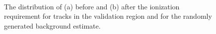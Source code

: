 \begin{figure}[h]
\centering
{}
\\
\caption{The distribution of \mdedx (a) before and (b) after the ionization requirement for tracks in the validation region and for the randomly generated background estimate.}
\label{fig:validation_mass}
\end{figure}
